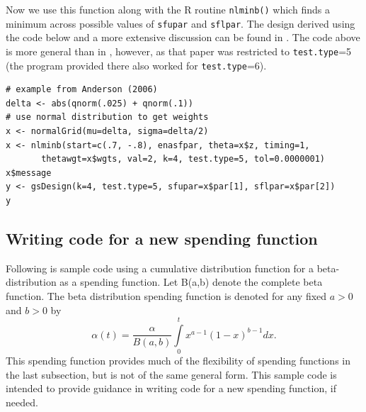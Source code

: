 Now we use this function along with the R routine \texttt{nlminb()} which
finds a minimum across possible values of \texttt{sfupar} and \texttt{sflpar}.
The design derived using the code below and a more extensive discussion can be
found in \cite{AndBMJ}. The code above is more general than in \cite{AndBMJ},
however, as that paper was restricted to \texttt{test.type}=5 (the program
provided there also worked for \texttt{test.type}=6).

\bigskip

\begin{verbatim}
# example from Anderson (2006)
delta <- abs(qnorm(.025) + qnorm(.1))
# use normal distribution to get weights
x <- normalGrid(mu=delta, sigma=delta/2)
x <- nlminb(start=c(.7, -.8), enasfpar, theta=x$z, timing=1, 
       thetawgt=x$wgts, val=2, k=4, test.type=5, tol=0.0000001)
x$message
y <- gsDesign(k=4, test.type=5, sfupar=x$par[1], sflpar=x$par[2])
y
\end{verbatim}

\subsection{Writing code for a new spending function\label{sec:newspendfn}}

Following is sample code using a cumulative distribution function for a
beta-distribution as a spending function. Let B(a,b) denote the complete beta
function. The beta distribution spending function is denoted for any
fixed $a>0$ and $b>0$ by%
\[
\alpha(t)=\frac{\alpha}{B(a,b)}%
{\textstyle\int\limits_{0}^{t}}
x^{a-1}(1-x)^{b-1}dx.
\]
This spending function provides much of the flexibility of spending functions
in the last subsection, but is not of the same general form. This sample code
is intended to provide guidance in writing code for a new spending function,
if needed.

